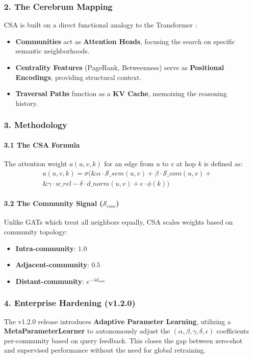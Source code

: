 \subsubsection{2. The Cerebrum Mapping}
CSA is built on a direct functional analogy to the Transformer \cite{vaswani2017attention}:
\begin{itemize}
\item \textbf{Communities} act as \textbf{Attention Heads}, focusing the search on specific semantic neigh\-borhoods.
\item \textbf{Centrality Features} (PageRank, Betweenness) serve as \textbf{Positional Encodings}, providing structural context.
\item \textbf{Traversal Paths} function as a \textbf{KV Cache}, memoizing the reasoning history.

\end{itemize}
\subsubsection{3. Methodology}

\paragraph{3.1 The CSA Formula}
The attention weight $a(u,v,k)$ for an edge from $u$ to $v$ at hop $k$ is defined as:
$$\begin{aligned}
a(u,v,k) = \sigma( \& \alpha \cdot \mathcal{S}\_{sem}(u,v) + \beta \cdot \mathcal{S}\_{com}(u,v) + \\
\& \gamma \cdot w\_{rel} - \delta \cdot d\_{norm}(u,v) + \epsilon \cdot \phi(k) )
\end{aligned}$$

\paragraph{3.2 The Community Signal ($\mathcal{S}_{com}$)}
Unlike GATs \cite{velickovic2018gat} which treat all neighbors equally, CSA scales weights based on community topology:
\begin{itemize}
\item \textbf{Intra-community}: $1.0$
\item \textbf{Adjacent-community}: $0.5$
\item \textbf{Distant-community}: $e^{-\lambda d_{com}}$

\end{itemize}
\subsubsection{4. Enterprise Hardening (v1.2.0)}
The v1.2.0 release introduces \textbf{Adaptive Parameter Learning}, utilizing a \textbf{MetaParameterLearner} to auton\-omously adjust the $(\alpha, \beta, \gamma, \delta, \epsilon)$ coeff\-icients per-community based on query feedback. This closes the gap between zero-shot and supervised performance without the need for global retraining.

